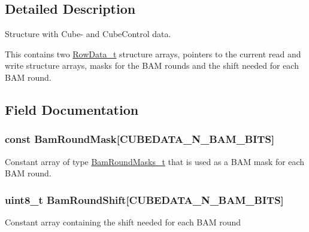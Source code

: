 \subsection{Detailed Description}
Structure with Cube-\/ and Cube\+Control data. 

This contains two \hyperlink{structRowData__t}{Row\+Data\+\_\+t} structure arrays, pointers to the current read and write structure arrays, masks for the B\+A\+M rounds and the shift needed for each B\+A\+M round. 

\subsection{Field Documentation}
\hypertarget{structCubeControlData__t_acf3c32d2a6071404856c5db95846864c}{}
\subsubsection[{Bam\+Round\+Mask}]{ const Bam\+Round\+Mask\mbox{[}{\bf C\+U\+B\+E\+D\+A\+T\+A\+\_\+\+N\+\_\+\+B\+A\+M\+\_\+\+B\+I\+T\+S}\mbox{]}}\label{structCubeControlData__t_acf3c32d2a6071404856c5db95846864c}
Constant array of type \hyperlink{CubeControlData_8h_a2b6850a8815b785ea51f17c4d979706e}{Bam\+Round\+Masks\+\_\+t} that is used as a B\+A\+M mask for each B\+A\+M round. \hypertarget{structCubeControlData__t_aa97c584a57c1f2500791985bbe8aef89}{}
\subsubsection[{Bam\+Round\+Shift}]{\setlength{\rightskip}{0pt plus 5cm}uint8\+\_\+t Bam\+Round\+Shift\mbox{[}{\bf C\+U\+B\+E\+D\+A\+T\+A\+\_\+\+N\+\_\+\+B\+A\+M\+\_\+\+B\+I\+T\+S}\mbox{]}}\label{structCubeControlData__t_aa97c584a57c1f2500791985bbe8aef89}
Constant array containing the shift needed for each B\+A\+M round \hypertarget{structCubeControlData__t_a1cf738638ac947d80a643d159c8eb2a2}{}
